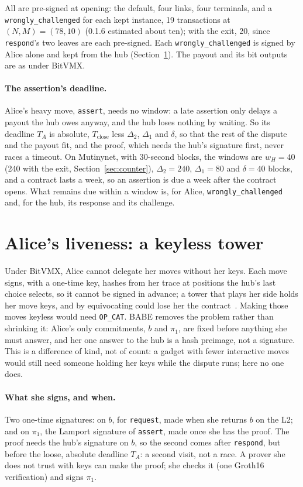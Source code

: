\documentclass[11pt]{article}
\newcommand{\Tc}{T_{\mathrm{close}}}
\newcommand{\tx}[1]{\texttt{#1}}
\begin{document}
All are pre-signed at opening: the default, four links, four terminals,
and a \tx{wrongly\_challenged} for each kept instance, 19 transactions at
$(N, M) = (78, 10)$ (0.1.6 estimated about ten); with the exit, 20, since
\tx{respond}'s two leaves are each pre-signed. Each
\tx{wrongly\_\allowbreak challenged} is signed by Alice alone and kept from the hub
(Section~\ref{sec:tower}). The payout and its bit outputs are as under
BitVMX.

\paragraph{The assertion's deadline.} Alice's heavy move, \tx{assert},
needs no window: a late assertion only delays a payout the hub owes
anyway, and the hub loses nothing by waiting. So its deadline $T_A$ is
absolute, $\Tc$ less $\Delta_2$, $\Delta_1$ and $\delta$, so that the
rest of the dispute and the payout fit, and the proof, which needs the
hub's signature first, never races a timeout. On Mutinynet, with
30-second blocks, the windows are $w_H = 40$ (240 with the exit,
Section~\ref{sec:counter}), $\Delta_2 = 240$,
$\Delta_1 = 80$ and $\delta = 40$ blocks, and a contract lasts a week, so
an assertion is due a week after the contract opens. What remains due
within a window is, for Alice, \tx{wrongly\_challenged} and, for the hub,
its response and its challenge.

\section{Alice's liveness: a keyless tower}
\label{sec:tower}

Under BitVMX, Alice cannot delegate her moves without her keys. Each move
signs, with a one-time key, hashes from her trace at positions the hub's
last choice selects, so it cannot be signed in advance; a tower that
plays her side holds her move keys, and by equivocating could lose her
the contract~\cite[\S 10]{lichenbitvmx}. Making those moves keyless would
need \texttt{OP\_CAT}. BABE removes the problem rather than shrinking
it: Alice's only commitments, $b$ and $\pi_1$, are fixed before anything
she must answer, and her one answer to the hub is a hash preimage, not a
signature. This is a difference of kind, not of count: a gadget with
fewer interactive moves would still need someone holding her keys while
the dispute runs; here no one does.

\paragraph{What she signs, and when.} Two one-time signatures: on $b$,
for \tx{request}, made when she returns $b$ on the L2; and on $\pi_1$,
the Lamport signature of \tx{assert}, made once she has the proof. The
proof needs the hub's signature on $b$, so the second comes after
\tx{respond}, but before the loose, absolute deadline $T_A$: a second
visit, not a race. A prover she does not trust with keys can make the
proof; she checks it (one Groth16 verification) and signs $\pi_1$.
\end{document}
